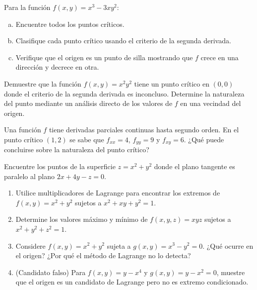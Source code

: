 \begin{prob}
Para la función $f(x,y) = x^3 - 3xy^2$:
\begin{enumerate}[a)]
    \item Encuentre todos los puntos críticos.
    \item Clasifique cada punto crítico usando el criterio de la segunda
    derivada.
    \item Verifique que el origen es un punto de silla mostrando que
    $f$ crece en una dirección y decrece en otra.
\end{enumerate}
\end{prob}

\begin{prob}
Demuestre que la función $f(x,y) = x^2 y^2$ tiene un punto crítico en
$(0,0)$ donde el criterio de la segunda derivada es inconcluso.
Determine la naturaleza del punto mediante un análisis directo de los
valores de $f$ en una vecindad del origen.
\end{prob}

\begin{prob}
Una función $f$ tiene derivadas parciales continuas hasta segundo orden.
En el punto crítico $(1,2)$ se sabe que $f_{xx}=4$, $f_{yy}=9$ y
$f_{xy}=6$. ¿Qué puede concluirse sobre la naturaleza del punto
crítico?
\end{prob}

\begin{prob}
Encuentre los puntos de la superficie $z = x^2 + y^2$ donde el plano
tangente es paralelo al plano $2x + 4y - z = 0$.
\end{prob}

\begin{prob}
\begin{enumerate}
    \item Utilice multiplicadores de Lagrange para encontrar los extremos de $f(x,y)=x^2+y^2$ sujetos a $x^2+xy+y^2=1$.
    \item Determine los valores máximo y mínimo de $f(x,y,z)=xyz$ sujetos a $x^2+y^2+z^2=1$.
    \item Considere $f(x,y)=x^2+y^2$ sujeta a $g(x,y)=x^3-y^2=0$. ¿Qué ocurre en el origen? ¿Por qué el método de Lagrange no lo detecta?
    \item (Candidato falso) Para $f(x,y)=y-x^4$ y $g(x,y)=y-x^2=0$, muestre que el origen es un candidato de Lagrange pero no es extremo condicionado.
\end{enumerate}
\end{prob}


